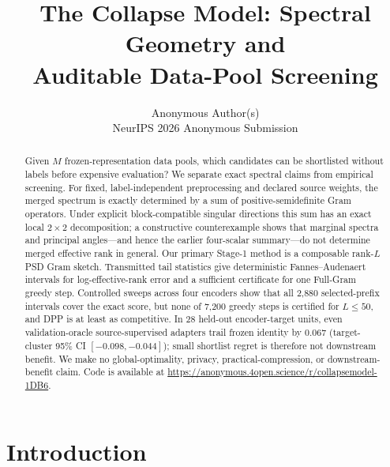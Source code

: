 \documentclass{article}
\title{The Collapse Model: Spectral Geometry and\\
       Auditable Data-Pool Screening}
\author{%
  Anonymous Author(s)\\
  NeurIPS 2026 Anonymous Submission%
}
\date{}
\begin{document}
\maketitle

\begin{abstract}
Given $M$ frozen-representation data pools, which candidates can be
shortlisted without labels before expensive evaluation?  We separate exact
spectral claims from empirical screening.  For fixed, label-independent
preprocessing and declared source weights, the merged spectrum is exactly
determined by a sum of positive-semidefinite Gram operators.  Under explicit
block-compatible singular directions this sum has an exact local
$2{\times}2$ decomposition; a constructive counterexample shows that
marginal spectra and principal angles---and hence the earlier four-scalar
summary---do not determine merged effective rank in general.  Our primary
Stage-1 method is a composable rank-$L$ PSD Gram sketch.  Transmitted tail
statistics give deterministic Fannes--Audenaert intervals for
log-effective-rank error and a sufficient certificate for one Full-Gram
greedy step.  Controlled sweeps across four encoders show that all 2,880
selected-prefix intervals cover the exact score, but none of 7,200 greedy
steps is certified for $L\leq50$, and DPP is at least as competitive.  In 28
held-out encoder-target units, even validation-oracle source-supervised
adapters trail frozen identity by $0.067$ (target-cluster 95\% CI
$[-0.098,-0.044]$); small shortlist regret is therefore not downstream
benefit.  We make no global-optimality, privacy, practical-compression, or
downstream-benefit claim.
Code is available at \url{https://anonymous.4open.science/r/collapsemodel-1DB6}.
\end{abstract}

\section{Introduction}
\label{sec:intro}
\end{document}

